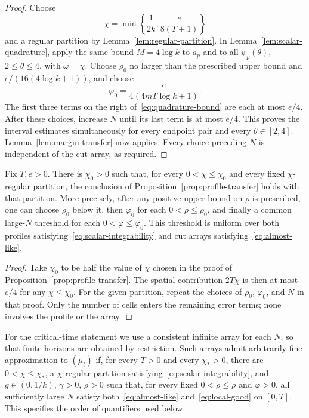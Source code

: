\begin{proof}
Choose
\[
 \chi=\min\left\{\frac1{2k},\frac e{8(T+1)}\right\}
\]
and a regular partition by Lemma~\ref{lem:regular-partition}. In
Lemma~\ref{lem:scalar-quadrature}, apply the same bound $M=4\log k$
to $a_p$ and to all $\psi_p(\theta)$, $2\le\theta\le4$, with
$\omega=\chi$. Choose $\rho_0$ no larger than the prescribed upper
bound and $e/(16(4\log k+1))$, and choose
\[
 \varphi_0=\frac e{4(4mT\log k+1)}.
\]
The first three terms on the right of~\eqref{eq:quadrature-bound}
are each at most $e/4$. After these choices, increase $N$ until its
last term is at most $e/4$. This proves the interval estimates
simultaneously for every endpoint pair and every $\theta\in[2,4]$.
Lemma~\ref{lem:margin-transfer} now applies. Every choice preceding
$N$ is independent of the cut array, as required.
\end{proof}

\begin{corollary}\label{cor:fixed-partition-transfer}
Fix $T,e>0$. There is $\chi_0>0$ such that, for every
$0<\chi\le\chi_0$ and every fixed $\chi$-regular partition, the
conclusion of Proposition~\ref{prop:profile-transfer} holds with that
partition. More precisely, after any positive upper bound on $\rho$
is prescribed, one can choose $\rho_0$ below it, then $\varphi_0$
for each $0<\rho\le\rho_0$, and finally a common large-$N$
threshold for each $0<\varphi\le\varphi_0$. This threshold is
uniform over both profiles satisfying~\eqref{eq:scalar-integrability}
and cut arrays satisfying~\eqref{eq:almost-like}.
\end{corollary}

\begin{proof}
Take $\chi_0$ to be half the value of $\chi$ chosen in the proof of
Proposition~\ref{prop:profile-transfer}. The spatial contribution
$2T\chi$ is then at most $e/4$ for any $\chi\le\chi_0$. For the
given partition, repeat the choices of $\rho_0$, $\varphi_0$, and
$N$ in that proof. Only the number of cells enters the remaining
error terms; none involves the profile or the array.
\end{proof}

For the critical-time statement we use a consistent infinite array for
each $N$, so that finite horizons are obtained by restriction. Such
arrays admit arbitrarily fine approximation to $(\mu_t)$ if, for every
$T>0$ and every $\chi_*>0$, there are $0<\chi\le\chi_*$, a
$\chi$-regular partition satisfying~\eqref{eq:scalar-integrability},
and $g\in(0,1/k)$, $\gamma>0$, $\bar\rho>0$ such that, for every
fixed $0<\rho\le\bar\rho$ and $\varphi>0$, all sufficiently large
$N$ satisfy both~\eqref{eq:almost-like} and~\eqref{eq:local-good}
on $[0,T]$. This specifies the order of quantifiers used below.

